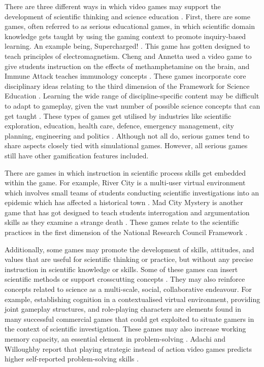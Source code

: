 	There are three different ways in which video games may support the development of scientific thinking and science education \cite{morris2013gaming}. First, there are some games, often referred to as serious educational games\cite{annetta2008serious}, in which scientific domain knowledge gets taught by using the gaming context to promote inquiry-based learning. An example being, Supercharged! \cite{squire2003harnessing}. This game has gotten designed to teach principles of electromagnetism. Cheng and Annetta used a video game to give students instruction on the effects of methamphetamine on the brain, and Immune Attack teaches immunology concepts \cite{cheng2012students}. These games incorporate core disciplinary ideas relating to the third dimension of the Framework for Science Education \cite{national2012framework}. Learning the wide range of discipline-specific content may be difficult to adapt to gameplay, given the vast number of possible science concepts that can get taught \cite{morris2013gaming}. These types of games get utilised by industries like scientific exploration, education, health care, defence, emergency management, city planning, engineering and politics \cite{wikiserious}. Although not all do, serious games tend to share aspects closely tied with simulational games. However, all serious games still have other gamification features included.
	
	There are games in which instruction in scientific process skills get embedded within the game. For example, River City is a multi-user virtual environment which involves small teams of students conducting scientific investigations into an epidemic which has affected a historical town \cite{galas2006river, nelson2007robust}. Mad City Mystery is another game that has got designed to teach students interrogation and argumentation skills as they examine a strange death \cite{squire2007mad}. These games relate to the scientific practices in the first dimension of the National Research Council Framework \cite{national2012framework}.
	
	Additionally, some games may promote the development of skills, attitudes, and values that are useful for scientific thinking or practice, but without any precise instruction in scientific knowledge or skills. Some of these games can insert scientific methods or support crosscutting concepts \cite{national2012framework}. They may also reinforce concepts related to science as a multi-scale, social, collaborative endeavour. For example, establishing cognition in a contextualised virtual environment, providing joint gameplay structures, and role-playing characters are elements found in many successful commercial games that could get exploited to situate gamers in the context of scientific investigation. These games may also increase working memory capacity, an essential element in problem-solving \cite{morris2013gaming}. Adachi and Willoughby report that playing strategic instead of action video games predicts higher self-reported problem-solving skills \cite{adachi2013more}. 
	
